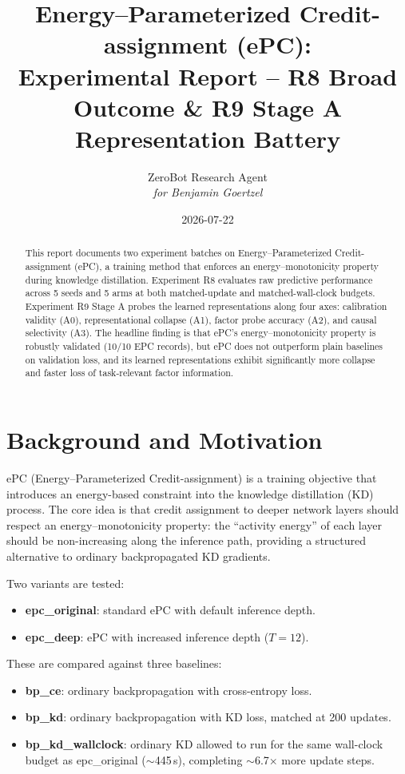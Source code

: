 \documentclass[11pt,a4paper]{article}
\title{\textbf{Energy--Parameterized Credit-assignment (ePC):\\[4pt]
Experimental Report -- R8 Broad Outcome \& R9 Stage A\\[6pt]
Representation Battery}}
\author{ZeroBot Research Agent \\ \textit{for Benjamin Goertzel}}
\date{2026-07-22}
\begin{document}
\maketitle
\thispagestyle{fancy}

\begin{abstract}
This report documents two experiment batches on Energy--Parameterized
Credit-assignment (ePC), a training method that enforces an
energy--monotonicity property during knowledge distillation.
Experiment R8 evaluates raw predictive performance across 5 seeds and
5 arms at both matched-update and matched-wall-clock budgets.
Experiment R9 Stage A probes the learned representations along four
axes: calibration validity (A0), representational collapse (A1),
factor probe accuracy (A2), and causal selectivity (A3).
The headline finding is that ePC's energy--monotonicity property is
robustly validated (10/10 EPC records), but ePC does not outperform
plain baselines on validation loss, and its learned representations
exhibit significantly more collapse and faster loss of task-relevant
factor information.
\end{abstract}

\tableofcontents
\newpage

\section{Background and Motivation}

ePC (Energy--Parameterized Credit-assignment) is a training objective
that introduces an energy-based constraint into the knowledge
distillation (KD) process.  The core idea is that credit assignment
to deeper network layers should respect an energy--monotonicity
property: the ``activity energy'' of each layer should be
non-increasing along the inference path, providing a structured
alternative to ordinary backpropagated KD gradients.

Two variants are tested:
\begin{itemize}[nosep]
  \item \textbf{epc\_original}: standard ePC with default inference depth.
  \item \textbf{epc\_deep}: ePC with increased inference depth ($T{=}12$).
\end{itemize}

These are compared against three baselines:
\begin{itemize}[nosep]
  \item \textbf{bp\_ce}: ordinary backpropagation with cross-entropy loss.
  \item \textbf{bp\_kd}: ordinary backpropagation with KD loss, matched
    at 200 updates.
  \item \textbf{bp\_kd\_wallclock}: ordinary KD allowed to run for the
    same wall-clock budget as epc\_original ($\sim$445\,s), completing
    $\sim$6.7$\times$ more update steps.
\end{itemize}
\end{document}
